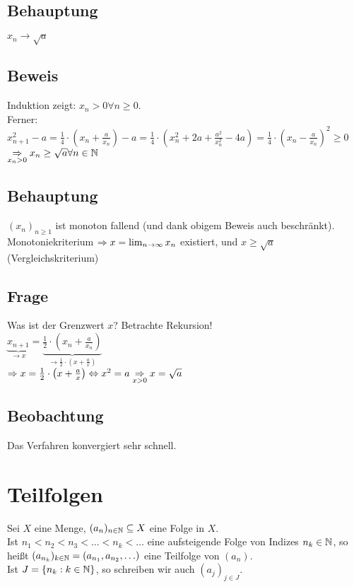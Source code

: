 \subsection*{Behauptung}
$x_n \to \sqrt{a}$

\subsection*{Beweis}
Induktion zeigt: $x_n > 0 \forall n \ge 0$.\\
Ferner: $x_{n+1}^2 - a = \frac{1}{4} \cdot \left(x_n + \frac{a}{x_n}\right) - a = \frac{1}{4} \cdot \left(x_n^2 + 2a + \frac{a^2}{x_n^2} - 4a \right) = \frac{1}{4} \cdot \left(x_n - \frac{a}{x_n}\right)^2 \ge 0$\\
$\underset{x_n > 0}{\Rightarrow} x_n \ge \sqrt{a} \forall n \in \mathbb{N}$

\subsection*{Behauptung}
$(x_n)_{n \ge 1}$ ist monoton fallend (und dank obigem Beweis auch beschränkt).\\
Monotoniekriterium $\Rightarrow x = \lim_{n \to \infty} x_n$ existiert, und $x \ge \sqrt{a}$ (Vergleichskriterium)

\subsection*{Frage}
Was ist der Grenzwert $x$? Betrachte Rekursion!\\
$\underbrace{x_{n+1}}_{\to x} = \underbrace{\frac{1}{2} \cdot \left(x_n + \frac{a}{x_n}\right)}_{\to \frac{1}{2} \cdot \left(x + \frac{a}{x}\right)}$\\
$\Rightarrow x = \frac{1}{2} \cdot \left(x + \frac{a}{x}\right) \Leftrightarrow x^2 = a \underset{x > 0}{\Rightarrow} x = \sqrt{a}$

\subsection*{Beobachtung}
Das Verfahren konvergiert sehr schnell.

\newpage

{}
\section*{Teilfolgen}\label{Teilfolgen}
Sei $X$ eine Menge, $(a_n)_{n \in \mathbb{N}} \subseteq X$ eine Folge in $X$.\\
Ist $n_1 < n_2 < n_3 < \hdots < n_k < \hdots$ eine aufsteigende Folge von Indizes $n_k \in \mathbb{N}$, so heißt $(a_{n_k})_{k \in \mathbb{N}} = (a_{n_1}, a_{n_2}, \hdots)$ eine Teilfolge von $(a_n)$.\\
Ist $J=\{n_k: k \in \mathbb{N}\}$, so schreiben wir auch $(a_j)_{j \in J}$.

